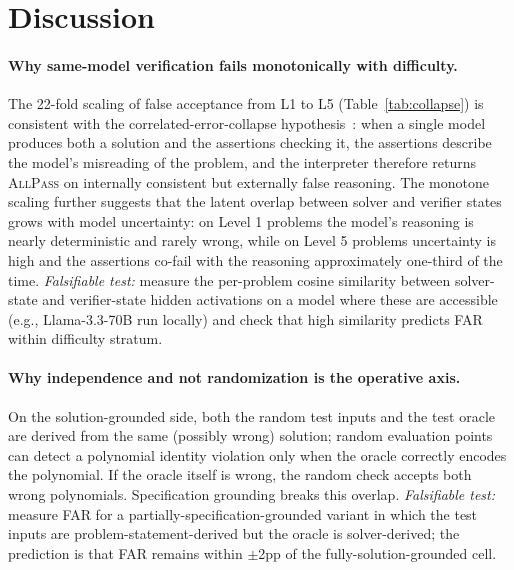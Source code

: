 \documentclass{article}
\begin{document}
\section{Discussion}

\paragraph{Why same-model verification fails monotonically with difficulty.} The 22-fold scaling of false acceptance from L1 to L5 (Table~\ref{tab:collapse}) is consistent with the correlated-error-collapse hypothesis~\citep{huang2024selfcorrect, tyen2024llm, stechly2024selfverify, kim2025correlated}: when a single model produces both a solution and the assertions checking it, the assertions describe the model's misreading of the problem, and the interpreter therefore returns \textsc{AllPass} on internally consistent but externally false reasoning. The monotone scaling further suggests that the latent overlap between solver and verifier states grows with model uncertainty: on Level 1 problems the model's reasoning is nearly deterministic and rarely wrong, while on Level 5 problems uncertainty is high and the assertions co-fail with the reasoning approximately one-third of the time. \emph{Falsifiable test:} measure the per-problem cosine similarity between solver-state and verifier-state hidden activations on a model where these are accessible (e.g., Llama-3.3-70B run locally) and check that high similarity predicts FAR within difficulty stratum.

\paragraph{Why independence and not randomization is the operative axis.} On the solution-grounded side, both the random test inputs and the test oracle are derived from the same (possibly wrong) solution; random evaluation points can detect a polynomial identity violation only when the oracle correctly encodes the polynomial. If the oracle itself is wrong, the random check accepts both wrong polynomials. Specification grounding breaks this overlap. \emph{Falsifiable test:} measure FAR for a partially-specification-grounded variant in which the test inputs are problem-statement-derived but the oracle is solver-derived; the prediction is that FAR remains within $\pm$2pp of the fully-solution-grounded cell.
\end{document}
